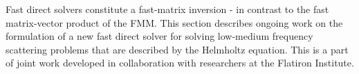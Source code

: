 Fast direct solvers constitute a fast-matrix inversion - in contrast to the fast matrix-vector product of the FMM. This section describes ongoing work on the formulation of a new fast direct solver for solving low-medium frequency scattering problems that are described by the Helmholtz equation. This is a part of joint work developed in collaboration with researchers at the Flatiron Institute. 
